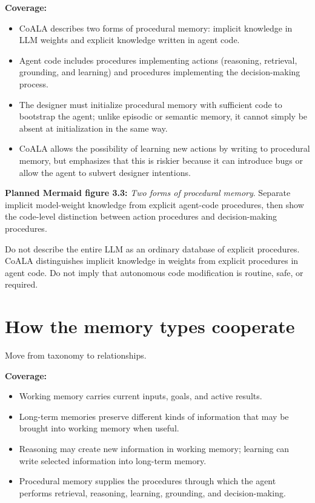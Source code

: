 \textbf{Coverage:}
\begin{itemize}
  \item CoALA describes two forms of procedural memory: implicit knowledge in LLM weights and explicit knowledge written in agent code.
  \item Agent code includes procedures implementing actions (reasoning, retrieval, grounding, and learning) and procedures implementing the decision-making process.
  \item The designer must initialize procedural memory with sufficient code to bootstrap the agent; unlike episodic or semantic memory, it cannot simply be absent at initialization in the same way.
  \item CoALA allows the possibility of learning new actions by writing to procedural memory, but emphasizes that this is riskier because it can introduce bugs or allow the agent to subvert designer intentions.
\end{itemize}

\textbf{Planned Mermaid figure 3.3:} \emph{Two forms of procedural memory}. Separate implicit model-weight knowledge from explicit agent-code procedures, then show the code-level distinction between action procedures and decision-making procedures.

\begin{warningbox}
Do not describe the entire LLM as an ordinary database of explicit procedures. CoALA distinguishes implicit knowledge in weights from explicit procedures in agent code. Do not imply that autonomous code modification is routine, safe, or required.
\end{warningbox}

\section{How the memory types cooperate}
Move from taxonomy to relationships.

\textbf{Coverage:}
\begin{itemize}
  \item Working memory carries current inputs, goals, and active results.
  \item Long-term memories preserve different kinds of information that may be brought into working memory when useful.
  \item Reasoning may create new information in working memory; learning can write selected information into long-term memory.
  \item Procedural memory supplies the procedures through which the agent performs retrieval, reasoning, learning, grounding, and decision-making.
\end{itemize}

